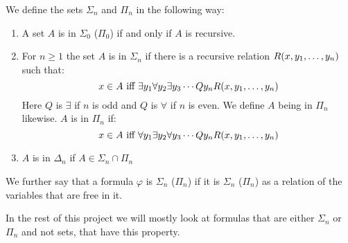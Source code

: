 \documentclass[../main.tex]{subfiles}
\begin{document}
\begin{defi}
	We define the sets $\Sigma_n$ and $\Pi_n$ in the following way:
	\begin{enumerate}
		\item A set $A$ is in $\Sigma_0$ ($\Pi_0$) if and only if $A$
			is recursive.
		\item For $n\geq 1$ the set $A$ is in $\Sigma_n$ if there is a
			recursive relation $R(x,y_1,\ldots,y_n)$ such that:
			$$x\in A\ \text{iff}\ \exists y_1\forall y_2\exists
			y_3\cdots Qy_nR(x,y_1,\ldots,y_n)$$
			Here $Q$ is $\exists$ if $n$ is odd and $Q$ is
			$\forall$ if $n$ is even. We define $A$ being in
			$\Pi_n$ likewise. $A$ is in $\Pi_n$ if:
			$$x\in A\ \text{iff}\ \forall y_1\exists y_2\forall
			y_3\cdots Qy_nR(x,y_1,\ldots,y_n)$$
		\item $A$ is in $\Delta_n$ if $A\in\Sigma_n\cap\Pi_n$
	\end{enumerate}
	We further say that a formula $\varphi$ is $\Sigma_n$ ($\Pi_n$) if it
	is $\Sigma_n$ ($\Pi_n$) as a relation of the variables that are free in
	it. 
\end{defi}
In the rest of this project we will mostly look at formulas that are either
$\Sigma_n$ or $\Pi_n$ and not sets, that have this property.
\end{document}
